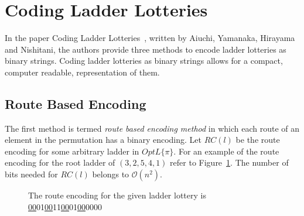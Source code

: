\section{Coding Ladder Lotteries}
In the paper Coding Ladder Lotteries~\cite{A5}, written by Aiuchi, Yamanaka, Hirayama and Nishitani, the authors provide three methods to encode ladder lotteries as 
binary strings. Coding ladder lotteries as binary strings allows for a compact, computer readable, representation of them.
\subsection{Route Based Encoding}
The first method is termed \emph{route based encoding method} in 
which each route of an element in the permutation has a binary encoding. Let $RC(l)$ be the route encoding for 
some arbitrary ladder in $OptL\{\pi\}$. 
For an example of the route encoding for the root ladder of $(3,2,5,4,1)$ refer to 
Figure~\ref{fig:route-encoding}. The number of bits needed for $RC(l)$ 
belongs to $\mathcal{O}(n^{2})$.\par 
\begin{figure}[!htp]
    \begin{center}
    \end{center}
   
 \caption{The route encoding for the given ladder lottery is \underline{00}01\underline{00}11\underline{00}01\underline{00}0000}
 \label{fig:route-encoding}

\end{figure}

